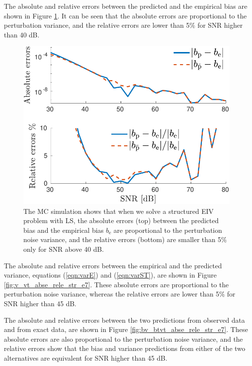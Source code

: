 The absolute and relative errors between the predicted and the empirical bias are shown in Figure \ref{fig:b_bt_abse_rele_str_e7}.
It can be seen that the absolute errors are proportional to the perturbation variance, and the relative errors are lower than 5\% for SNR higher than 40 dB. 

\begin{figure}[htb!]
  \centering
  \includegraphics[width=1\columnwidth]{./ChapterStatisticalAnalysis/fig/Fig_6.pdf} 
  \caption{ \label{fig:b_bt_abse_rele_str_e7} The MC simulation shows that when we solve a structured EIV problem with LS, the absolute errors (top) between the predicted bias and the empirical bias $b_{\mathrm{e}}$ are proportional to the perturbation noise variance, and the relative errors (bottom) are smaller than 5\% only for SNR above 40 dB.}
\end{figure}


The absolute and relative errors between the empirical and the predicted variance, equations (\ref{eqn:varE}) and (\ref{eqn:varST}), are shown in Figure \ref{fig:v_vt_abse_rele_str_e7}.
These absolute errors are proportional to the perturbation noise variance, whereas
the relative errors are lower than 5\% for SNR higher than 45 dB. 

The absolute and relative errors between the two predictions from observed data and from exact data, are shown in Figure \ref{fig:bv_btvt_abse_rele_str_e7}.
These absolute errors are also proportional to the perturbation noise variance, and
the relative errors show that the bias and variance predictions from either of the two alternatives are equivalent for SNR higher than 45 dB.

